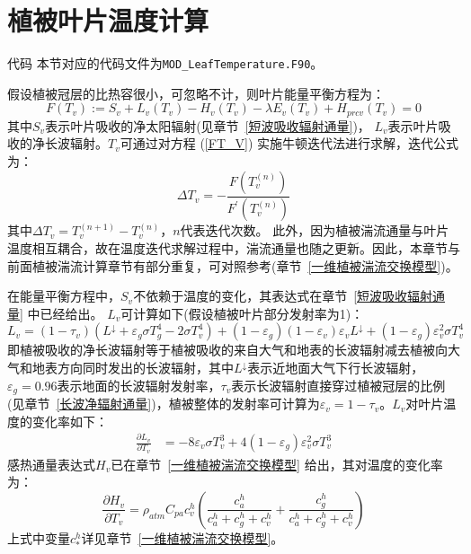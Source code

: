\chapter{植被叶片温度计算}\label{植被叶片温度计算}
\begin{mymdframed}{代码}
本节对应的代码文件为\texttt{MOD\_LeafTemperature.F90}。
\end{mymdframed}

假设植被冠层的比热容很小，可忽略不计，则叶片能量平衡方程为：
\begin{equation}\label{FT_V}
F\left(T_{v}\right):=S_{v}+L_{v}\left(T_{v}\right)-H_{v}\left(T_{v}\right)-\lambda E_{v}\left(T_{v}\right)+H_{p r c v}\left(T_{v}\right)=0
\end{equation}
其中$S_v$表示叶片吸收的净太阳辐射(见章节~\ref{短波吸收辐射通量})，
$L_v$表示叶片吸收的净长波辐射。$T_v$可通过对方程 (\ref{FT_V}) 实施牛顿迭代法进行求解，迭代公式为：
\begin{equation}
\Delta T_{v}=-\frac{F\left(T_{v}^{(n)}\right)}{F^{\prime}\left(T_{v}^{(n)}\right)}
\end{equation}
其中$\Delta T_v=T_v^{\left(n+1\right)}-T_v^{\left(n\right)}$，$n$代表迭代次数。
此外，因为植被湍流通量与叶片温度相互耦合，故在温度迭代求解过程中，湍流通量也随之更新。因此，本章节与前面植被湍流计算章节有部分重复，可对照参考(章节~\ref{一维植被湍流交换模型})。

在能量平衡方程中，$S_v$不依赖于温度的变化，其表达式在章节~\ref{短波吸收辐射通量} 中已经给出。
$L_v$可计算如下(假设植被叶片部分发射率为1)：
\begin{equation}
L_{v}=\left(1-\tau_{v}\right)\left(L ^\downarrow+\varepsilon_{g} \sigma T_{g}^{4}-2 \sigma T_{v}^{4}\right) + \left( 1- \varepsilon_{g} \right )\left(1-\varepsilon_{v} \right)\varepsilon_{v} L^\downarrow + \left( 1- \varepsilon_{g} \right ) \varepsilon_{v}^2 \sigma T_{v}^4
\end{equation}
即植被吸收的净长波辐射等于植被吸收的来自大气和地表的长波辐射减去植被向大气和地表方向同时发出的长波辐射，其中$L^\downarrow$表示近地面大气下行长波辐射，$\varepsilon_g=0.96$表示地面的长波辐射发射率，$\tau_{v}$表示长波辐射直接穿过植被冠层的比例(见章节~\ref{长波净辐射通量})，植被整体的发射率可计算为$\varepsilon_v=1-\tau_v$。$L_v$对叶片温度的变化率如下：
\begin{equation}
\begin{aligned}
 \frac{\partial L_{v}}{\partial T_{v}} &= -8 \varepsilon_{v}\sigma T_{v}^{3} + 4 \left( 1- \varepsilon_{g} \right ) \varepsilon_{v}^2 \sigma T_{v}^3
\end{aligned}
\end{equation}
感热通量表达式$H_{v}$已在章节~\ref{一维植被湍流交换模型} 给出，其对温度的变化率为：
\begin{equation}
\frac{\partial H_{v}}{\partial T_{v}}=\rho_{atm} C_{pa} c_{v}^{h} \left( \frac{c_{a}^{h}}{c_{a}^{h} + c_{g}^{h} + c_{v}^{h}} + \frac{c_{g}^{h}}{c_{a}^{h} + c_{g}^{h} + c_{v}^{h}} \right)
\end{equation}
上式中变量$c_*^h$详见章节~\ref{一维植被湍流交换模型}。

